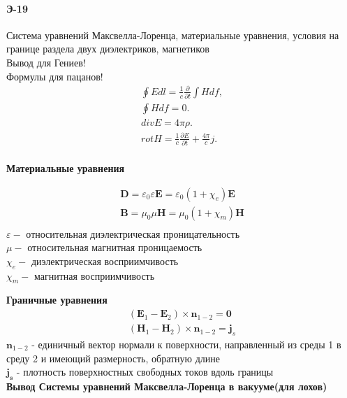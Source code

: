 \documentclass[__main__.tex]{subfiles}
\begin{document}
\paragraph{Э-19}
Система уравнений Максвелла-Лоренца, материальные уравнения, условия на границе раздела двух диэлектриков, магнетиков\\

Вывод для Гениев!\\
Формулы для пацанов!\\
\begin{gather*}
	\oint Edl = \frac{1}{c}\frac{\partial}{\partial t}\int Hdf,\\
	\oint H df = 0.\\
	div E = 4\pi\rho.\\
	rot H = \frac{1}{c}\frac{\partial E}{\partial t} + \frac{4\pi}{c}j.\\
\end{gather*}

 \textbf{Материальные уравнения}

\begin{gather*}
	\mathbf {D} =\varepsilon _{0}\varepsilon \mathbf {E} =\varepsilon _{0}(1+\chi _{e})\mathbf {E} \\
	\mathbf {B} =\mu _{0}\mu \mathbf {H} =\mu _{0}(1+\chi _{m})\mathbf {H} \\
\end{gather*}
$\varepsilon-$ относительная диэлектрическая проницательность\\
$\mu-$ относительная магнитная проницаемость\\
$\chi _{e}-$ диэлектрическая восприимчивость\\
$\chi _{m}-$ магнитная восприимчивость

 \textbf{Граничные уравнения}\\

 \begin{gather*}
	(\mathbf {E} _{1}-\mathbf {E} _{2})\times \mathbf {n} _{1-2}=\mathbf {0} \\
{\displaystyle (\mathbf {H} _{1}-\mathbf {H} _{2})\times \mathbf {n} _{1-2}=\mathbf {j} _{s}} 
\end{gather*}
$\mathbf {n} _{1-2}$ - единичный вектор нормали к поверхности, направленный из среды 1 в среду 2 и имеющий размерность, обратную длине\\ 
$\mathbf {{j} _{s}}$ - плотность поверхностных свободных токов вдоль границы\\

\textbf{Вывод Системы уравнений Максвелла-Лоренца в вакууме(для лохов)}\\
\end{document}
